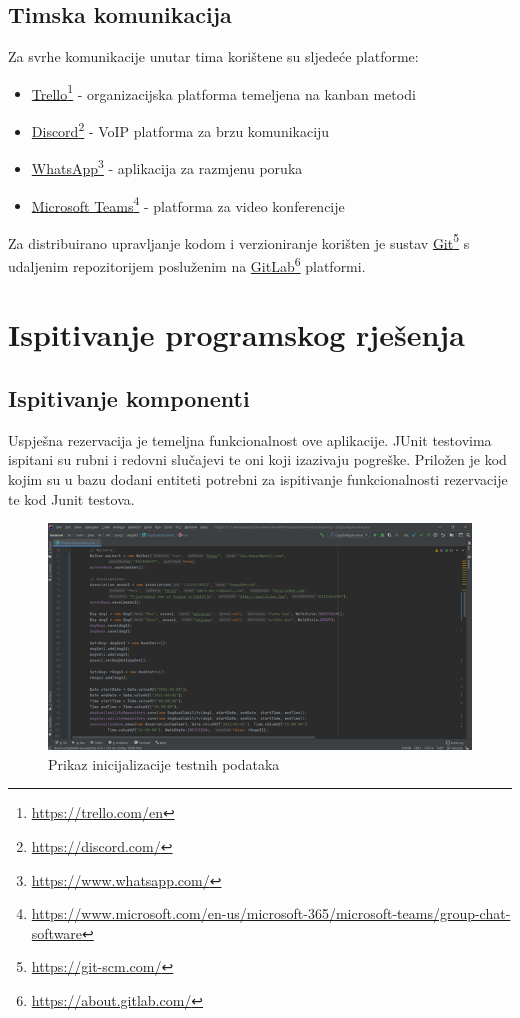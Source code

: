 			\subsection{Timska komunikacija}
			Za svrhe komunikacije unutar tima korištene su sljedeće platforme: 
			\begin{itemize}
			    \itemsep-0.5em
			    \item  \uline{Trello}\footnote{\url{https://trello.com/en}} - organizacijska platforma temeljena na kanban metodi
			    \item \uline{Discord}\footnote{\url{https://discord.com/}} - VoIP platforma za brzu komunikaciju
			    \item \uline{WhatsApp}\footnote{\url{https://www.whatsapp.com/}} - aplikacija za razmjenu poruka
			    \item \uline{Microsoft Teams}\footnote{\url{https://www.microsoft.com/en-us/microsoft-365/microsoft-teams/group-chat-software}} -  platforma za video konferencije
			\end{itemize}
			\medskip
			\noindent Za distribuirano upravljanje kodom i verzioniranje korišten je sustav \uline{Git}\footnote{\url{https://git-scm.com/}} s udaljenim repozitorijem posluženim na \uline{GitLab}\footnote{\url{https://about.gitlab.com/}} platformi.
	        \eject 
		
	
		\section{Ispitivanje programskog rješenja}
			
			\subsection{Ispitivanje komponenti}
			
			Uspješna rezervacija je temeljna funkcionalnost ove aplikacije. JUnit testovima ispitani su rubni i redovni slučajevi te oni koji izazivaju pogreške. Priložen je kod kojim su u bazu dodani entiteti potrebni za ispitivanje funkcionalnosti rezervacije te kod Junit testova. 
			
			\begin{figure}[H]
				\includegraphics[scale=1]{slike/ispitivanje-sustava-1.png} 
				\centering
				\caption{Prikaz inicijalizacije testnih podataka}
				\label{fig:testiranje}
			\end{figure}
			
